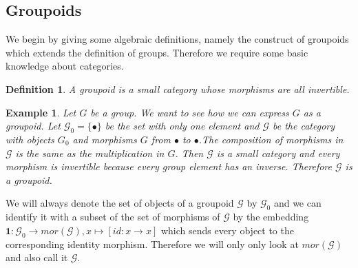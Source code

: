 \documentclass[12pt,a4paper]{scrartcl}
\newtheorem{Definition}[Theorem]{Definition}
\newtheorem{Example}[Theorem]{Example}
\numberwithin{equation}{section}
\newcommand{\2}{\mathbb{Z} / 2 \mathbb{Z}}
\newcommand{\1}{\overline{1}}
\newcommand{\0}{\overline{0}}
\begin{document}
\subsection{Groupoids}
We begin by giving some algebraic definitions, namely the construct of groupoids which extends the definition of groups. Therefore we require some basic knowledge about categories. 
\begin{Definition}
	A groupoid is a small category whose morphisms are all invertible.
\end{Definition}
\begin{Example} \label{group}
	Let $G$ be a group. We want to see how we can express $G$ as a groupoid. Let $\mathcal{G}_0 = \{\bullet\}$ be the set with only one element  and $\mathcal{G}$ be the category with objects $G_0$ and morphisms $G$ from $\bullet$ to $\bullet$.The composition of morphisms in $\mathcal{G}$ is the same as the multiplication in $G$. Then $\mathcal{G}$ is a small category and every morphism is invertible because every group element has an inverse. Therefore $\mathcal{G}$ is a groupoid.
\end{Example}
We will always denote the set of objects of a groupoid $\mathcal{G}$ by $\mathcal{G}_0$ and we can identify it with a subset of the set of morphisms of $\mathcal{G}$ by the embedding $\textbf{1}: \mathcal{G}_0 \to mor(\mathcal{G}), x \mapsto [id: x \to x]$ which sends every object to the corresponding identity morphism. Therefore we will only only look at $mor(\mathcal{G})$ and also call it $\mathcal{G}$. 
\end{document}
